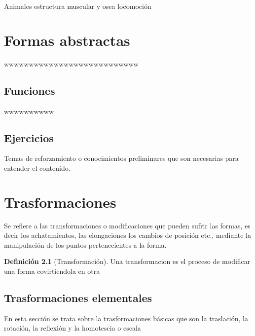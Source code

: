 \documentclass[16pt,]{krantz}
\theoremstyle{definition}
\newtheorem{definition}{Definición}[chapter]
\theoremstyle{definition}
\theoremstyle{definition}
\theoremstyle{definition}
\theoremstyle{remark}
\begin{document}
Animales estructura muscular y osea locomoción

\hypertarget{formas-abstractas}{%
\chapter{Formas abstractas}\label{formas-abstractas}}

wwwwwwwwwwwwwwwwwwwwwwwwwww

\hypertarget{funciones}{%
\section{Funciones}\label{funciones}}

wwwwwwwwww \citep{vincze2014college}

\hypertarget{ejercicios}{%
\section{Ejercicios}\label{ejercicios}}

\hypertarget{appendix-apendice}{%
\appendix {}}


Temas de reforzamiento o conocimientos preliminares que son necesarias para entender el contenido.

\hypertarget{trasformaciones}{%
\chapter{Trasformaciones}\label{trasformaciones}}

Se refiere a las transformaciones o modificaciones que pueden sufrir las formas, es decir los achatamientos, las elongaciones los cambios de posición etc., mediante la manipulación de los puntos pertenecientes a la forma.

\begin{definition}[Transformación]
\protect\hypertarget{def:transformacion}{}{\label{def:transformacion} {} }Una transformacion es el proceso de modificar una forma covirtiendola en otra
\end{definition}

\hypertarget{trasformaciones-elementales}{%
\section{Trasformaciones elementales}\label{trasformaciones-elementales}}

En esta sección se trata sobre la trasformaciones básicas que son la traslación, la rotación, la reflexión y la homotescia o escala
\end{document}
